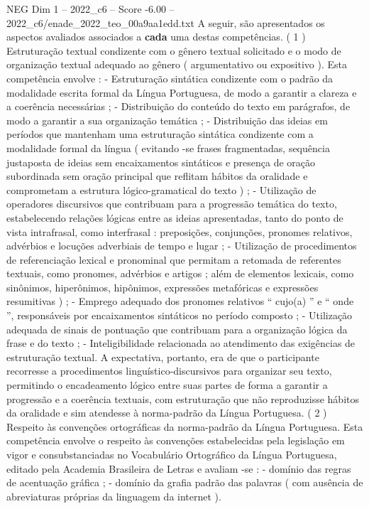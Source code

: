 \begin{textsample}{NEG Dim 1 – 2022\_c6 – Score -6.00 – 2022\_c6/enade\_2022\_teo\_00a9aa1edd.txt}
A seguir, são apresentados os aspectos avaliados associados a \textbf{cada} uma destas competências. ( 1 ) Estruturação textual condizente com o gênero textual solicitado e o modo de organização textual adequado ao gênero ( argumentativo ou expositivo ).
Esta competência envolve : - Estruturação sintática condizente com o padrão da modalidade escrita formal da Língua Portuguesa, de modo a garantir a clareza e a coerência necessárias ; - Distribuição do conteúdo do texto em parágrafos, de modo a garantir a sua organização temática ; - Distribuição das ideias em períodos que mantenham uma estruturação sintática condizente com a modalidade formal da língua ( evitando -se frases fragmentadas, sequência justaposta de ideias sem encaixamentos sintáticos e presença de oração subordinada sem oração principal que reflitam hábitos da oralidade e comprometam a estrutura lógico-gramatical do texto ) ; - Utilização de operadores discursivos que contribuam para a progressão temática do texto, estabelecendo relações lógicas entre as ideias apresentadas, tanto do ponto de vista intrafrasal, como interfrasal : preposições, conjunções, pronomes relativos, advérbios e locuções adverbiais de tempo e lugar ; - Utilização de procedimentos de referenciação lexical e pronominal que permitam a retomada de referentes textuais, como pronomes, advérbios e artigos ; além de elementos lexicais, como sinônimos, hiperônimos, hipônimos, expressões metafóricas e expressões resumitivas ) ; - Emprego adequado dos pronomes relativos “ cujo(a) ” e “ onde ”, responsáveis por encaixamentos sintáticos no período composto ; - Utilização adequada de sinais de pontuação que contribuam para a organização lógica da frase e do texto ; - Inteligibilidade relacionada ao atendimento das exigências de estruturação textual.
A expectativa, portanto, era de que o participante recorresse a procedimentos linguístico-discursivos para organizar seu texto, permitindo o encadeamento lógico entre suas partes de forma a garantir a progressão e a coerência textuais, com estruturação que não reproduzisse hábitos da oralidade e sim atendesse à norma-padrão da Língua Portuguesa. ( 2 ) Respeito às convenções ortográficas da norma-padrão da Língua Portuguesa.
Esta competência envolve o respeito às convenções estabelecidas pela legislação em vigor e consubstanciadas no Vocabulário Ortográfico da Língua Portuguesa, editado pela Academia Brasileira de Letras e avaliam -se : - domínio das regras de acentuação gráfica ; - domínio da grafia padrão das palavras ( com ausência de abreviaturas próprias da linguagem da internet ).

\end{textsample}
